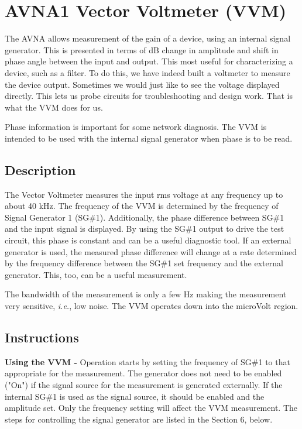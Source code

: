 \section{AVNA1 Vector Voltmeter  (VVM)}
\label{sect:VVM}
The AVNA allows measurement of the gain of a device, using an internal signal generator.  This is presented in terms of dB change in amplitude and shift in phase angle between the input and output.  This most useful for characterizing a device, such as a filter.  To do this, we have indeed built a voltmeter to measure the device output.  Sometimes we would just like to see the voltage displayed directly.  This lets us probe circuits for troubleshooting  and design work.   That is what the VVM does for us.

Phase information is important for some network diagnosis.  The VVM is intended to be used with the internal signal generator when phase is to be read.

\subsection{Description}
\label{subsect:VVMDescr}
The Vector Voltmeter measures the input rms voltage at any frequency up to about 40 kHz.  The frequency of the VVM is determined by the frequency of Signal Generator 1 (SG\#1).  Additionally, the phase difference between SG\#1 and the input signal is displayed.  By using the SG\#1 output to drive the test circuit, this phase is constant and can be a useful diagnostic tool.   If an external generator is used, the measured phase difference will change at a rate determined by the frequency difference between the SG\#1 set frequency and the external generator.    This, too, can be a useful measurement.  

The bandwidth of the measurement is only a few Hz making the measurement very sensitive, \textit{i.e.}, low noise.  The VVM operates down into the microVolt  region.

\subsection{Instructions}
\label{subsect:VVMInstr}
\textbf{Using the VVM - }Operation starts  by setting the frequency of SG\#1 to that appropriate for the measurement.  The generator does not need to be enabled ("On") if the signal source for the measurement is generated externally.  If the internal SG\#1 is used as the signal source, it should be enabled and the amplitude set.   Only the frequency setting will affect the VVM measurement.  The steps for controlling the signal generator are listed in the Section 6, below.

